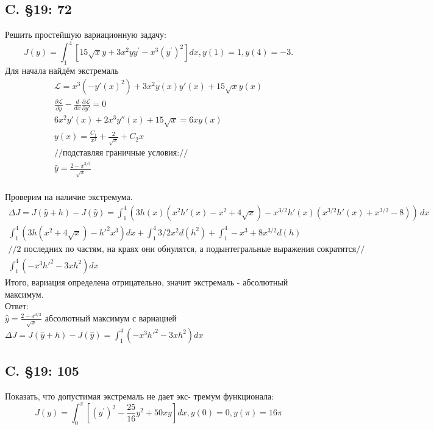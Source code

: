 \documentclass{article}
\newcommand{\Lagr}{\mathcal{L}}
\begin{document}
\subsection{C. \S19: 72}
Решить простейшую вариационную задачу:
\begin{equation}
J(y)=\int_{1}^{4}\left[15 \sqrt{x} y+3 x^{2} y y^{\prime}-x^{3}\left(y^{\prime}\right)^{2}\right] d x, y(1)=1, y(4)=-3 .
\end{equation}
Для начала найдём экстремаль
\begin{gather*}
    \Lagr =x^3 \left(-y'(x)^2\right)+3 x^2 y(x) y'(x)+15 \sqrt{x} y(x)\\
    \frac{\partial \Lagr}{\partial y}  - \frac{d }{d x} \frac{\partial \Lagr}{\partial y'} =0   \\
    6 x^2 y'(x)+2 x^3 y''(x)+15 \sqrt{x}=6 x y(x)\\
    y(x) =\frac{C_1}{x^3}+\frac{2}{\sqrt{x}}+C_2 x\\
    //\text{подставляя граничные условия:}//\\
    \hat y=\frac{2-x^{3/2}}{\sqrt{x}}\\
\end{gather*}

Проверим на наличие экстремума.
\begin{gather*}
    \Delta J = J(\hat y + h) - J(\hat y) = \int_1^4 \left(3 h(x) \left(x^2 h'(x)-x^2+4 \sqrt{x}\right)-x^{3/2} h'(x) \left(x^{3/2} h'(x)+x^{3/2}-8\right)\right) \, dx  \\
    \int_1^4 \left( 3 h \left(x^{2}+4 \sqrt{x} \right) - h'^2 x^3 \right) dx + \int_1^4 3/2 x^2 d(h^2)  + \int_1^4 - x^3 + 8x^{3/2}d(h) \\
    //\text{2 последних по частям, на краях они обнулятся, а подынтегральные выражения сократятся}//\\
    \int_1^4  \left(-x^3 h'^2 -3x h^2 \right)dx
\end{gather*}
Итого, вариация определена отрицательно, значит экстремаль - абсолютный максимум.\\
Ответ: \\
$\hat y = \frac{2-x^{3/2}}{\sqrt{x}}$  абсолютный максимум с вариацией $\Delta J = J(\hat y + h) - J(\hat y) =\int_1^4  \left(-x^3 h'^2 -3x h^2 \right)dx$


\subsection{C. \S19: 105}
Показать, что допустимая экстремаль не дает экс-
тремум функционала:
\begin{equation}
J(y)=\int_{0}^{\pi}\left[\left(y^{\prime}\right)^{2}-\frac{25}{16} y^{2}+50 x y\right] d x, y(0)=0, y(\pi)=16 \pi
\end{equation}
\end{document}
